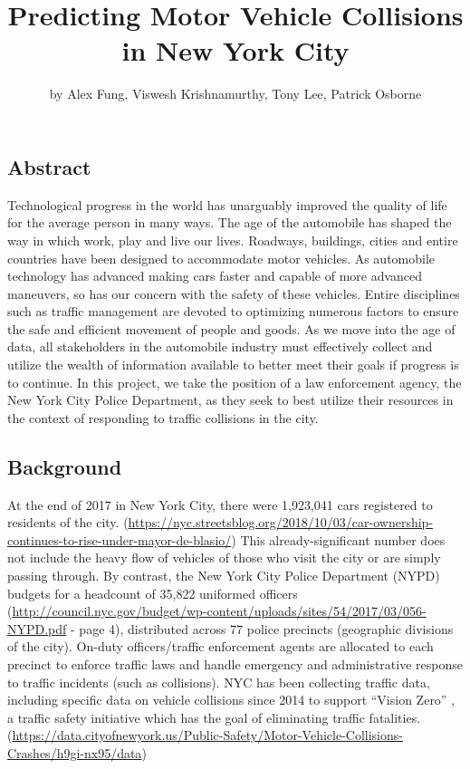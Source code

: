\title{Predicting Motor Vehicle Collisions in New York City}
\author{by Alex Fung, Viswesh Krishnamurthy, Tony Lee, Patrick Osborne}

\maketitle


\hypertarget{abstract}{%
\subsection{Abstract}\label{abstract}}

Technological progress in the world has unarguably improved the quality
of life for the average person in many ways. The age of the automobile
has shaped the way in which work, play and live our lives. Roadways,
buildings, cities and entire countries have been designed to accommodate
motor vehicles. As automobile technology has advanced making cars faster
and capable of more advanced maneuvers, so has our concern with the
safety of these vehicles. Entire disciplines such as traffic management
are devoted to optimizing numerous factors to ensure the safe and
efficient movement of people and goods. As we move into the age of data,
all stakeholders in the automobile industry must effectively collect and
utilize the wealth of information available to better meet their goals
if progress is to continue. In this project, we take the position of a
law enforcement agency, the New York City Police Department, as they
seek to best utilize their resources in the context of responding to
traffic collisions in the city.

\hypertarget{background}{%
\subsection{Background}\label{background}}

At the end of 2017 in New York City, there were 1,923,041 cars
registered to residents of the city.
(\url{https://nyc.streetsblog.org/2018/10/03/car-ownership-continues-to-rise-under-mayor-de-blasio/})
This already-significant number does not include the heavy flow of
vehicles of those who visit the city or are simply passing through. By
contrast, the New York City Police Department (NYPD) budgets for a
headcount of 35,822 uniformed officers
(\url{http://council.nyc.gov/budget/wp-content/uploads/sites/54/2017/03/056-NYPD.pdf}
- page 4), distributed across 77 police precincts (geographic divisions
of the city). On-duty officers/traffic enforcement agents are allocated
to each precinct to enforce traffic laws and handle emergency and
administrative response to traffic incidents (such as collisions). NYC
has been collecting traffic data, including specific data on vehicle
collisions since 2014 to support ``Vision Zero'' , a traffic safety
initiative which has the goal of eliminating traffic fatalities.
(\url{https://data.cityofnewyork.us/Public-Safety/Motor-Vehicle-Collisions-Crashes/h9gi-nx95/data})

